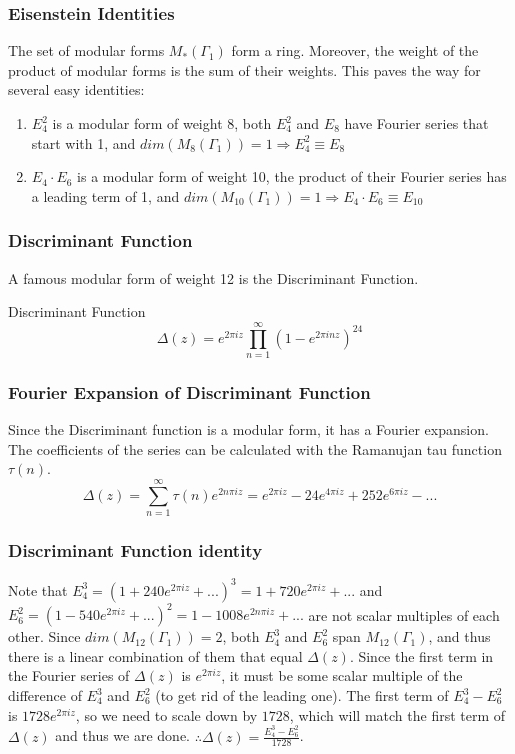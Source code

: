 \documentclass{beamer}
\begin{document}
\begin{frame}
\frametitle{Eisenstein Identities}
The set of modular forms $M_{*}(\Gamma_1)$ form a ring. Moreover, the weight of the product of  modular forms is the sum of their weights. This paves the way for several easy identities: \\
\begin{enumerate}
\item $E_4^2$ is a modular form of weight $8$, both $E_4^2$ and $E_8$ have Fourier series that start with 1, and $dim(M_8(\Gamma_1)) = 1 \Rightarrow E_4^2 \equiv E_8$  
\item  $E_4 \cdot E_6$ is a modular form of weight 10, the product of their Fourier series has a leading term of 1, and $dim(M_{10}(\Gamma_1)) = 1 \Rightarrow E_4 \cdot E_6 \equiv E_{10}$
\end{enumerate}
\end{frame}

\begin{frame}
\frametitle{Discriminant Function}
A famous modular form of weight 12 is the Discriminant Function. 
\begin{block}{Discriminant Function}
$$\Delta(z) = e^{2 \pi i z} \prod_{n=1}^{\infty} (1-e^{2 \pi i n z})^{24}$$
\end{block}
\end{frame}

\begin{frame}
\frametitle{Fourier Expansion of Discriminant Function}
Since the Discriminant function is a modular form, it has a Fourier expansion. The coefficients of the series can be calculated with the Ramanujan tau function $\tau(n)$. \\
$$\Delta(z) = \sum_{n = 1}^{\infty} \tau(n) e^{2n\pi i z} = e^{2 \pi i z} - 24 e^{4\pi i z} + 252 e^{6 \pi i z} -...$$
\end{frame}

\begin{frame}
\frametitle{Discriminant Function identity}
Note that $E_4^3 = (1 + 240e^{2\pi i z} + ...)^3 = 1+720e^{2\pi i z}+...$ and $E_6^2 = (1-540e^{2\pi i z}+...)^2 = 1 - 1008 e^{2n\pi i z}+...$ are not scalar multiples of each other. Since $dim(M_12(\Gamma_1)) = 2$, both $E_4^3$ and $E_6^2$ span $M_{12}(\Gamma_1)$, and thus there is a linear combination of them that equal $\Delta(z)$. Since the first term in the Fourier series of $\Delta(z)$ is $e^{2\pi i z}$, it must be some scalar multiple of the difference of  $E_4^3$ and $E_6^2$ (to get rid of the leading one). The first term of $E_4^3 - E_6^2$ is $1728e^{2\pi i z}$, so we need to scale down by $1728$, which will match the first term of $\Delta(z)$ and thus we are done. $\therefore \Delta(z) = \frac{E_4^3 - E_6^2}{1728}$. 
\end{frame}
\end{document}
